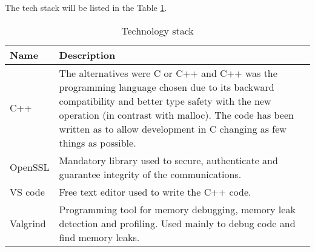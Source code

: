 The tech stack will be listed in the Table \ref{tab:tech-stack}.
\begin{longtable}{|p{}|p{}|}
	\caption{Technology stack}
	\label{Technology stack} 
	\label{tab:tech-stack} \\
	\hline
	\textbf{Name} & \textbf{Description} \\
	\hline
	C++ & The alternatives were C or C++ and C++ was the programming language chosen due to its backward compatibility and better type safety with the new operation (in contrast with malloc). The code has been written as to allow development in C changing as few things as possible. \\
	\hline
	OpenSSL & Mandatory library used to secure, authenticate and guarantee integrity of the communications. \\
	\hline
	VS code & Free text editor used to write the C++ code. \\
	\hline
	Valgrind & Programming tool for memory debugging, memory leak detection and profiling. Used mainly to debug code and find memory leaks. \\
	\hline
\end{longtable}%
	

